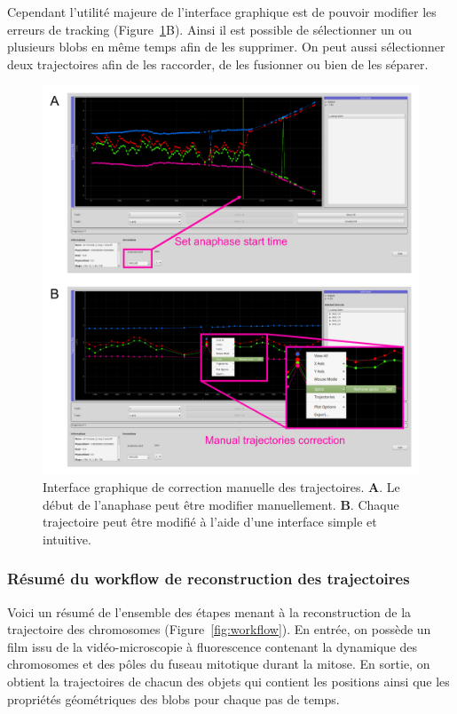 \documentclass[12pt,a4paper,twoside,openright]{book}
\begin{document}
Cependant l'utilité majeure de l'interface graphique est de pouvoir
modifier les erreurs de tracking (Figure~\ref{fig:gui}B). Ainsi il est
possible de sélectionner un ou plusieurs blobs en même temps afin de les
supprimer. On peut aussi sélectionner deux trajectoires afin de les
raccorder, de les fusionner ou bien de les séparer.

\begin{figure}[htbp]
\centering
\includegraphics{figures/results/imaging/gui.png}
\caption[Interface graphique de correction manuelle des trajectoires]{\label{fig:gui}Interface
graphique de correction manuelle des trajectoires. \textbf{A}. Le début
de l'anaphase peut être modifier manuellement. \textbf{B}. Chaque
trajectoire peut être modifié à l'aide d'une interface simple et
intuitive.}
\end{figure}

\subsubsection{Résumé du workflow de reconstruction des
trajectoires}\label{ruxe9sumuxe9-du-workflow-de-reconstruction-des-trajectoires}

Voici un résumé de l'ensemble des étapes menant à la reconstruction de
la trajectoire des chromosomes (Figure~\ref{fig:workflow}). En entrée,
on possède un film issu de la vidéo-microscopie à fluorescence contenant
la dynamique des chromosomes et des pôles du fuseau mitotique durant la
mitose. En sortie, on obtient la trajectoires de chacun des objets qui
contient les positions ainsi que les propriétés géométriques des blobs
pour chaque pas de temps.
\end{document}
